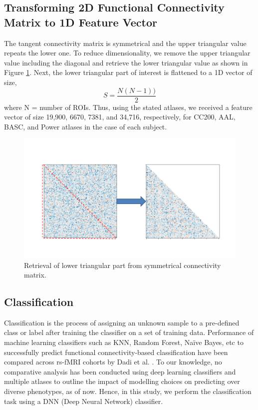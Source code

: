 \subsection{Transforming 2D Functional Connectivity Matrix to 1D Feature Vector}

The tangent connectivity matrix is symmetrical and the upper triangular value repeats the
lower one. To reduce dimensionality, we remove the upper triangular value including the
diagonal and retrieve the lower triangular value as shown in Figure \ref{fig:3.7}. Next, the lower triangular part of interest is flattened to a 1D vector of size, 
\begin{equation}
S=\frac{N(N-1))}{2}
\label{S_equation}
\end{equation}
where N = number of ROIs. Thus, using the stated atlases, we received a feature vector of size 19,900, 6670, 7381, and 34,716, respectively, for CC200, AAL, BASC, and Power atlases in the case of each subject.\\

\begin{figure}[h!]
\centering
\includegraphics[width=\linewidth]{figures/Figure 3.7.png}
\caption{Retrieval of lower triangular part from symmetrical connectivity matrix.}
\label{fig:3.7}
\end{figure}

\subsection{Classification}

Classification is the process of assigning an unknown sample to a pre-defined class or label
after training the classifier on a set of training data. Performance of machine learning
classifiers such as \Gls{KNN}, Random Forest, Naïve Bayes, etc to successfully predict functional
connectivity-based classification have been compared across rs-fMRI cohorts by Dadi et
al. \cite{dadi2019benchmarking}. To our knowledge, no comparative analysis has been conducted using deep learning
classifiers and multiple atlases to outline the impact of modelling choices on predicting over
diverse phenotypes, as of now. Hence, in this study, we perform the classification task using
a DNN (Deep Neural Network) classifier.\\

